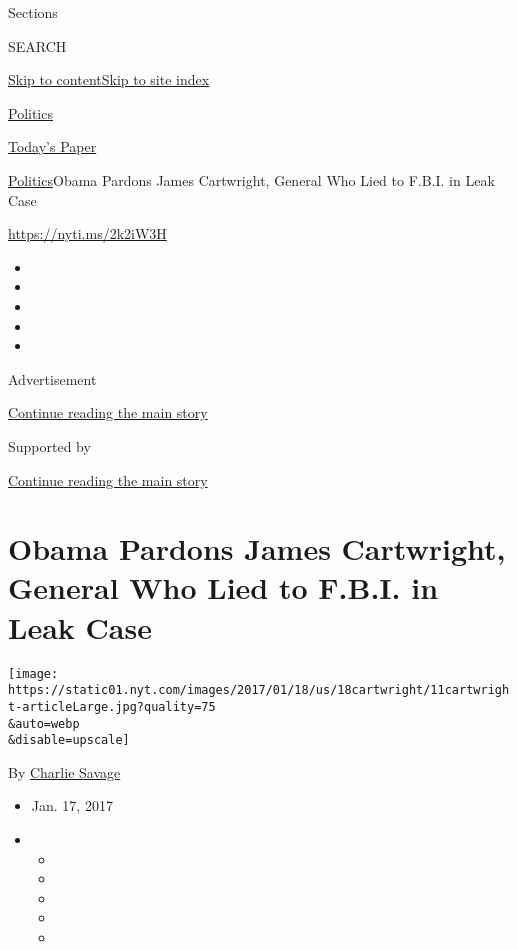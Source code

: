 Sections

SEARCH

\protect\hyperlink{site-content}{Skip to
content}\protect\hyperlink{site-index}{Skip to site index}

\href{https://www.nytimes.com/section/politics}{Politics}

\href{https://myaccount.nytimes.com/auth/login?response_type=cookie\&client_id=vi}{}

\href{https://www.nytimes.com/section/todayspaper}{Today's Paper}

\href{/section/politics}{Politics}\textbar{}Obama Pardons James
Cartwright, General Who Lied to F.B.I. in Leak Case

\url{https://nyti.ms/2k2iW3H}

\begin{itemize}
\item
\item
\item
\item
\item
\end{itemize}

Advertisement

\protect\hyperlink{after-top}{Continue reading the main story}

Supported by

\protect\hyperlink{after-sponsor}{Continue reading the main story}

\hypertarget{obama-pardons-james-cartwright-general-who-lied-to-fbi-in-leak-case}{%
\section{Obama Pardons James Cartwright, General Who Lied to F.B.I. in
Leak
Case}\label{obama-pardons-james-cartwright-general-who-lied-to-fbi-in-leak-case}}

\texttt{[image: https://static01.nyt.com/images/2017/01/18/us/18cartwright/11cartwright-articleLarge.jpg?quality=75\\\&auto=webp\\\&disable=upscale]}

By \href{http://www.nytimes.com/by/charlie-savage}{Charlie Savage}

\begin{itemize}
\item
  Jan. 17, 2017
\item
  \begin{itemize}
  \item
  \item
  \item
  \item
  \item
  \end{itemize}
\end{itemize}

